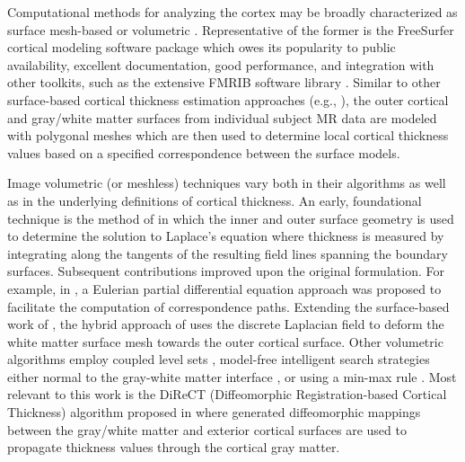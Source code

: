 Computational methods for analyzing the cortex may be 
broadly characterized as surface mesh-based or volumetric \citep{scott2009,clarkson2011}.  Representative of the former is the
FreeSurfer
%
cortical modeling software package \citep{dale1999,fischl1999,fischl2000,fischl2002,fischl2004}
which owes its popularity to public availability, excellent documentation, 
good performance, and integration with other toolkits, such as the extensive FMRIB software 
library \citep{smith2004}.  Similar to other surface-based cortical thickness estimation
approaches (e.g., \cite{davatzikos1996,magnotta1999,macdonald2000,kim2005}), the outer cortical
and gray/white matter surfaces from individual subject MR data are modeled with polygonal meshes
which are then used to determine local cortical thickness values based on a specified correspondence between 
the surface models.

Image volumetric (or meshless) techniques vary both in their algorithms as well as
in the underlying definitions of cortical thickness.  An early, foundational technique is the
method of \cite{jones2000} in which the inner and outer surface geometry is used to determine the
solution to Laplace's equation where thickness is measured by integrating along the 
tangents of the resulting field lines spanning the boundary surfaces.  Subsequent contributions
improved upon the original formulation.  For example, in \cite{yezzi2003}, a Eulerian partial differential equation approach
was proposed to facilitate the computation of correspondence paths.  Extending the surface-based
work of \cite{macdonald2000}, the hybrid approach of
\cite{kim2005} uses the discrete Laplacian field to deform the white matter surface mesh towards the 
outer cortical surface.    
Other volumetric algorithms employ coupled
level sets \citep{zeng1999}, model-free intelligent search strategies either normal to 
the gray-white matter interface \citep{scott2009}, or using a min-max rule \citep{clement-vachet2011}.
Most relevant to this work is the DiReCT (Diffeomorphic Registration-based 
Cortical Thickness) algorithm proposed in \cite{das2009} where generated
diffeomorphic mappings between the 
gray/white matter and exterior cortical surfaces are used to propagate thickness values
through the cortical gray matter.  

